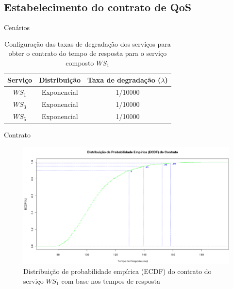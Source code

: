\documentclass[xcolor=svgnames]{beamer}
\begin{document}
\subsection{Estabelecimento do contrato de QoS}

  \begin{frame}{Cenários}
      \begin{table}[!h]
	    \centering
      {\footnotesize
	    \caption{Configuração das taxas de degradação dos serviços  para obter o contrato do tempo de resposta para o serviço composto $WS_1$ }
	    \label{table:contract_configurations}
	  \begin{tabular}{|c|c|c|}
		\hline
		Serviço    &   Distribuição      &     Taxa de degradação ($\lambda$)      \\
		\hline
		$WS_1$     &    Exponencial      &      1/10000      \\
		$WS_3$     &    Exponencial      &      1/10000      \\
		$WS_5$     &    Exponencial      &      1/10000      \\
		\hline
		\end{tabular}
      }
      \end{table}
  \end{frame}
  

  \begin{frame}{Contrato}

    \begin{figure}[H]
	\centering
	\includegraphics[width=1.0\linewidth]{figures/contract.png}
	\caption{Distribuição de probabilidade empírica (ECDF) do contrato do serviço $WS_1$ com base nos tempos de resposta  }
	\label{figure:contract}
    \end{figure}
  \end{frame}
\end{document}

